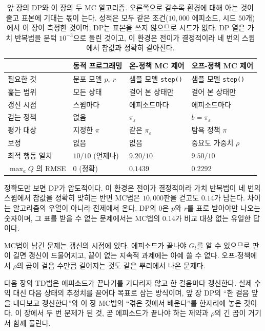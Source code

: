 \documentclass[11pt,a4paper]{article}
\begin{document}
\begin{table}[htbp]
\centering
\caption{앞 장의 DP와 이 장의 두 MC 알고리즘. 오른쪽으로 갈수록 환경에 대해 아는 것이 줄고 표본에
기대는 몫이 는다. 성적은 모두 같은 조건($10{,}000$ 에피소드, 시드 $50$개)에서 이 장이 측정한
것이며, DP는 표본을 쓰지 않으므로 시드가 없다. DP 열은 가치 반복법을 문턱 $10^{-3}$으로 돌린
것이고, 이 환경은 전이가 결정적이라 네 번의 스윕에서 참값과 정확히 같아진다.}
\label{tab:three}
\small
\begin{tabular}{@{}llll@{}}
\toprule
 & 동적 프로그래밍 & 온-정책 MC 제어 & 오프-정책 MC 제어 \\
\midrule
필요한 것      & 분포 모델 $p,\ r$    & 샘플 모델 \lstinline|step()| & 샘플 모델 \lstinline|step()| \\
훑는 범위      & 모든 상태            & 걸어 본 상태만       & 걸어 본 상태만 \\
갱신 시점      & 스윕마다             & 에피소드마다         & 에피소드마다 \\
걷는 정책      & 없음                 & $\pi_\varepsilon$    & $b = \pi_\varepsilon$ \\
평가 대상      & 지정한 $\pi$         & 같은 $\pi_\varepsilon$ & 탐욕 정책 $\pi$ \\
보정           & 없음                 & 없음                 & 중요도 가중치 $\rho$ \\
\midrule
최적 행동 일치 & $10/10$ (언제나)     & $9.20/10$            & $9.50/10$ \\
$\max_a Q$ 의 RMSE & $0$ (정확)      & $0.1439$             & $0.2292$ \\
\bottomrule
\end{tabular}
\end{table}

정확도만 보면 DP가 압도적이다. 이 환경은 전이가 결정적이라 가치 반복법이 네 번의 스윕에서 참값을
정확히 맞히는 반면 MC법은 $10{,}000$판을 걷고도 $0.14$가 남는다. 차이는 알고리즘의 우열이 아니라
전제에서 온다. DP의 $0$은 $p$와 $r$를 표로 받아야만 나오는 숫자이며, 그 표를 받을 수 없는 문제에서는
MC법의 $0.14$가 비교 대상 없는 유일한 답이다.

MC법이 남긴 문제는 갱신의 시점에 있다. 에피소드가 끝나야 $G_t$를 알 수 있으므로 판이 길면 갱신이
드물어지고, 끝이 없는 지속적 과제에는 아예 쓸 수 없다. 오프-정책에서 $\rho$의 곱이 걸음 수만큼
길어지는 것도 같은 뿌리에서 나온 문제다.

다음 장의 TD법은 에피소드가 끝나기를 기다리지 않고 한 걸음마다 갱신한다. 실제 수익 대신 다음 상태의
추정치를 끌어다 목표로 삼는 방식이며, 앞 장 DP의 ``한 걸음 앞을 내다보고 갱신한다''와 이 장 MC법의
``겪은 것에서 배운다''를 한자리에 놓은 것이다. 이 장에서 두 번 문제가 된 것, 곧 에피소드가 끝나야
하는 제약과 $\rho$의 긴 곱이 거기서 함께 풀린다.
\appendix
\end{document}
